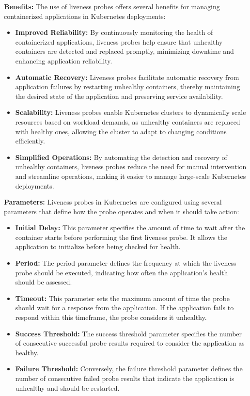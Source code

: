 \textbf{Benefits:}
The use of liveness probes offers several benefits for managing containerized applications in Kubernetes deployments:

\begin{itemize}
    \item \textbf{Improved Reliability:} By continuously monitoring the health of containerized applications, liveness probes help ensure that unhealthy containers are detected and replaced promptly, minimizing downtime and enhancing application reliability.
    
    \item \textbf{Automatic Recovery:} Liveness probes facilitate automatic recovery from application failures by restarting unhealthy containers, thereby maintaining the desired state of the application and preserving service availability.
    
    \item \textbf{Scalability:} Liveness probes enable Kubernetes clusters to dynamically scale resources based on workload demands, as unhealthy containers are replaced with healthy ones, allowing the cluster to adapt to changing conditions efficiently.
    
    \item \textbf{Simplified Operations:} By automating the detection and recovery of unhealthy containers, liveness probes reduce the need for manual intervention and streamline operations, making it easier to manage large-scale Kubernetes deployments.
\end{itemize}

\textbf{Parameters:}
Liveness probes in Kubernetes are configured using several parameters that define how the probe operates and when it should take action:

\begin{itemize}
    \item \textbf{Initial Delay:} This parameter specifies the amount of time to wait after the container starts before performing the first liveness probe. It allows the application to initialize before being checked for health.
    
    \item \textbf{Period:} The period parameter defines the frequency at which the liveness probe should be executed, indicating how often the application's health should be assessed.
    
    \item \textbf{Timeout:} This parameter sets the maximum amount of time the probe should wait for a response from the application. If the application fails to respond within this timeframe, the probe considers it unhealthy.
    
    \item \textbf{Success Threshold:} The success threshold parameter specifies the number of consecutive successful probe results required to consider the application as healthy.
    
    \item \textbf{Failure Threshold:} Conversely, the failure threshold parameter defines the number of consecutive failed probe results that indicate the application is unhealthy and should be restarted.
\end{itemize}

